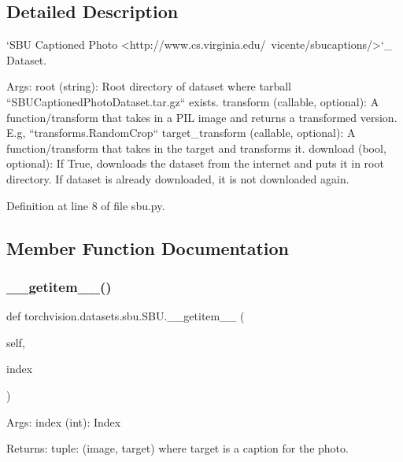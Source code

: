 \subsection{Detailed Description}
\begin{DoxyVerb}`SBU Captioned Photo <http://www.cs.virginia.edu/~vicente/sbucaptions/>`_ Dataset.

Args:
    root (string): Root directory of dataset where tarball
        ``SBUCaptionedPhotoDataset.tar.gz`` exists.
    transform (callable, optional): A function/transform that takes in a PIL image
        and returns a transformed version. E.g, ``transforms.RandomCrop``
    target_transform (callable, optional): A function/transform that takes in the
        target and transforms it.
    download (bool, optional): If True, downloads the dataset from the internet and
        puts it in root directory. If dataset is already downloaded, it is not
        downloaded again.
\end{DoxyVerb}
 

Definition at line 8 of file sbu.\+py.



\subsection{Member Function Documentation}
\mbox{\label{classtorchvision_1_1datasets_1_1sbu_1_1SBU_ab6f31fb52ca68fa57de0cd60c0f1a499}} 
\subsubsection{\texorpdfstring{\+\_\+\+\_\+getitem\+\_\+\+\_\+()}{\_\_getitem\_\_()}}
{\footnotesize\ttfamily def torchvision.\+datasets.\+sbu.\+S\+B\+U.\+\_\+\+\_\+getitem\+\_\+\+\_\+ (\begin{DoxyParamCaption}\item[{}]{self,  }\item[{}]{index }\end{DoxyParamCaption})}

\begin{DoxyVerb}Args:
    index (int): Index

Returns:
    tuple: (image, target) where target is a caption for the photo.
\end{DoxyVerb}
 


